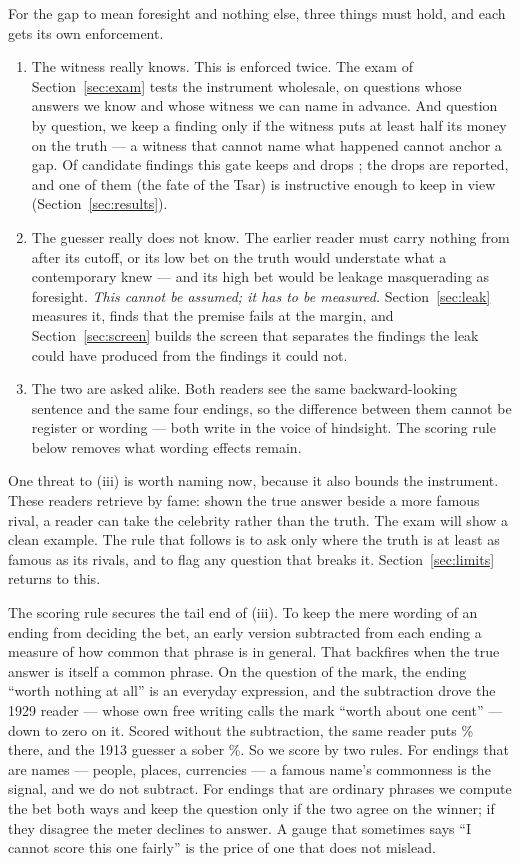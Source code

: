\documentclass[11pt]{article}
\begin{document}
For the gap to mean foresight and nothing else, three things must hold, and each gets its own enforcement.
\begin{enumerate}[label=(\roman*),leftmargin=2.2em,itemsep=2pt]
\item The witness really knows. This is enforced twice. The exam of Section~\ref{sec:exam} tests the
instrument wholesale, on questions whose answers we know and whose witness we can name in advance. And
question by question, we keep a finding only if the witness puts at least half its money on the truth ---
a witness that cannot name what happened cannot anchor a gap. Of \NgateBefore{} candidate findings this
gate keeps \NgatePassed{} and drops \NgateDropped{}; the drops are reported, and one of them (the fate of
the Tsar) is instructive enough to keep in view (Section~\ref{sec:results}).
\item The guesser really does not know. The earlier reader must carry nothing from after its cutoff, or
its low bet on the truth would understate what a contemporary knew --- and its high bet would be leakage
masquerading as foresight. \emph{This cannot be assumed; it has to be measured.} Section~\ref{sec:leak}
measures it, finds that the premise fails at the margin, and Section~\ref{sec:screen} builds the screen
that separates the findings the leak could have produced from the findings it could not.
\item The two are asked alike. Both readers see the same backward-looking sentence and the same four
endings, so the difference between them cannot be register or wording --- both write in the voice of
hindsight. The scoring rule below removes what wording effects remain.
\end{enumerate}

One threat to (iii) is worth naming now, because it also bounds the instrument. These readers retrieve by
fame: shown the true answer beside a more famous rival, a reader can take the celebrity rather than the
truth. The exam will show a clean example. The rule that follows is to ask only where the truth is at least
as famous as its rivals, and to flag any question that breaks it. Section~\ref{sec:limits} returns to this.

The scoring rule secures the tail end of (iii). To keep the mere wording of an ending from deciding the
bet, an early version subtracted from each ending a measure of how common that phrase is in general. That
backfires when the true answer is itself a common phrase. On the question of the mark, the ending ``worth
nothing at all'' is an everyday expression, and the subtraction drove the 1929 reader --- whose own free
writing calls the mark ``worth about one cent'' --- down to zero on it. Scored without the subtraction, the
same reader puts \NmarkRawTN\% there, and the 1913 guesser a sober \NmarkRawTh\%. So we score by two rules.
For endings that are names --- people, places, currencies --- a famous name's commonness is the signal, and
we do not subtract. For endings that are ordinary phrases we compute the bet both ways and keep the
question only if the two agree on the winner; if they disagree the meter declines to answer. A gauge that
sometimes says ``I cannot score this one fairly'' is the price of one that does not mislead.
\end{document}
